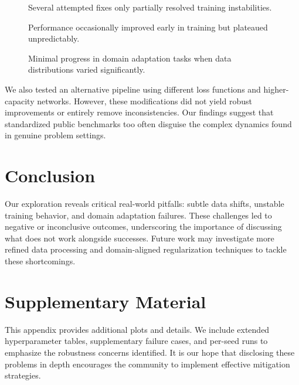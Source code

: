 \begin{figure}[t]
    \centering
    \caption{Several attempted fixes only partially resolved training instabilities.}
    \label{fig:exp2}
\end{figure}

\begin{figure}[t]
    \centering
    \caption{Performance occasionally improved early in training but plateaued unpredictably.}
    \label{fig:exp3}
\end{figure}

\begin{figure}[t]
    \centering
    \caption{Minimal progress in domain adaptation tasks when data distributions varied significantly.}
    \label{fig:exp4}
\end{figure}

We also tested an alternative pipeline using different loss functions and higher-capacity networks. However, these modifications did not yield robust improvements or entirely remove inconsistencies. Our findings suggest that standardized public benchmarks too often disguise the complex dynamics found in genuine problem settings.

\section{Conclusion}
Our exploration reveals critical real-world pitfalls: subtle data shifts, unstable training behavior, and domain adaptation failures. These challenges led to negative or inconclusive outcomes, underscoring the importance of discussing what does not work alongside successes. Future work may investigate more refined data processing and domain-aligned regularization techniques to tackle these shortcomings.

\clearpage



\appendix
\section{Supplementary Material}
This appendix provides additional plots and details. We include extended hyperparameter tables, supplementary failure cases, and per-seed runs to emphasize the robustness concerns identified. It is our hope that disclosing these problems in depth encourages the community to implement effective mitigation strategies.
